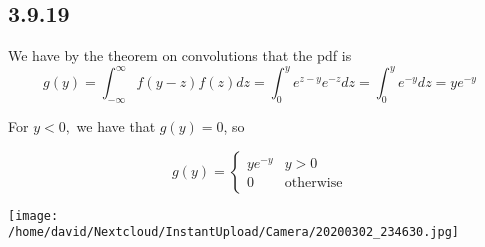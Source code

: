 \documentclass[12pt,letterpaper]{article}
\theoremstyle{definition}
\begin{document}
\subsection*{3.9.19}

We have by the theorem on convolutions that the pdf is
\[
  g(y) = \int_{-\infty}^\infty f(y - z)f(z)dz = \int_{0}^y
  e^{z-y}e^{-z}dz = \int_0^y e^{-y}dz = ye^{-y}
\]

For $y < 0,$ we have that $g(y) = 0$, so

\[
  g(y) = \begin{cases}
    ye^{-y} & y > 0 \\
    0 & \text{otherwise} 
  \end{cases}
\]

\texttt{[image: /home/david/Nextcloud/InstantUpload/Camera/20200302\_234630.jpg]}
\end{document}
